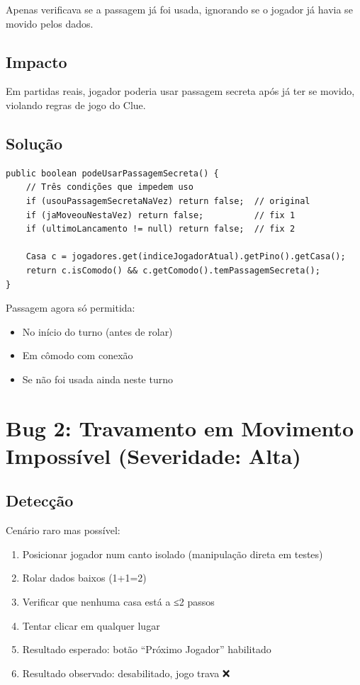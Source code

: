 \documentclass[12pt,a4paper]{report}
\begin{document}
Apenas verificava se a passagem já foi usada, ignorando se o jogador já havia se movido pelos dados.

\subsection{Impacto}

Em partidas reais, jogador poderia usar passagem secreta após já ter se movido, violando regras de jogo do Clue.

\subsection{Solução}

\begin{lstlisting}
public boolean podeUsarPassagemSecreta() {
    // Três condições que impedem uso
    if (usouPassagemSecretaNaVez) return false;  // original
    if (jaMoveouNestaVez) return false;          // fix 1
    if (ultimoLancamento != null) return false;  // fix 2

    Casa c = jogadores.get(indiceJogadorAtual).getPino().getCasa();
    return c.isComodo() && c.getComodo().temPassagemSecreta();
}
\end{lstlisting}

Passagem agora só permitida:
\begin{itemize}
    \item No início do turno (antes de rolar)
    \item Em cômodo com conexão
    \item Se não foi usada ainda neste turno
\end{itemize}

\section{Bug 2: Travamento em Movimento Impossível (Severidade: Alta)}

\subsection{Detecção}

Cenário raro mas possível:
\begin{enumerate}
    \item Posicionar jogador num canto isolado (manipulação direta em testes)
    \item Rolar dados baixos (1+1=2)
    \item Verificar que nenhuma casa está a ≤2 passos
    \item Tentar clicar em qualquer lugar
    \item Resultado esperado: botão ``Próximo Jogador'' habilitado
    \item Resultado observado: desabilitado, jogo trava ❌
\end{enumerate}
\end{document}
